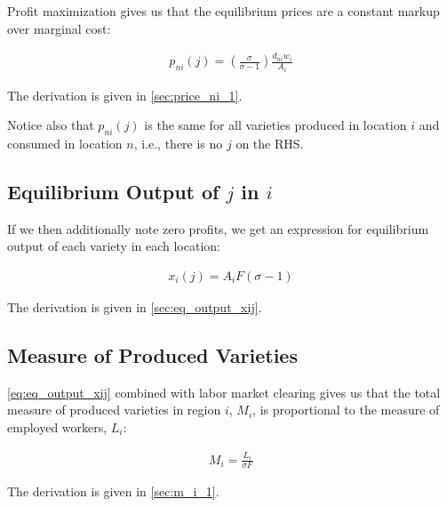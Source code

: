 \documentclass[10pt]{article}
\begin{document}
Profit maximization  
gives us that 
the equilibrium prices are a 
constant markup over marginal cost:

\begin{align}
    p_{n i}(j)=\left(\frac{\sigma}{\sigma-1}\right) \frac{d_{n i} w_i}{A_i} \label{eq:price_ni_1}
\end{align}

The derivation is given in \autoref{sec:price_ni_1}.

Notice also that $p_{n i}(j)$ is the 
same for all varieties produced in location $i$ and 
consumed in location $n$, i.e.,
there is no $j$ on the RHS. 

\subsection{Equilibrium Output of $j$ in $i$}

If we then additionally note zero profits, we get
an expression for equilibrium output of each variety
in each location:

\begin{align}
    x_i(j)=A_i F(\sigma-1) \label{eq:eq_output_xij}
\end{align}

The derivation is given in \autoref{sec:eq_output_xij}.

\subsection{Measure of Produced Varieties}

\eqref{eq:eq_output_xij} combined with labor market 
clearing gives us that 
the total measure of produced varieties in region $i$, $M_i$,
is proportional to the 
measure of employed workers, $L_i$:

\begin{align}
    M_i = \frac{L_i}{\sigma F} \label{eq:m_i_1}
\end{align}

The derivation is given in \autoref{sec:m_i_1}.


\end{document}
